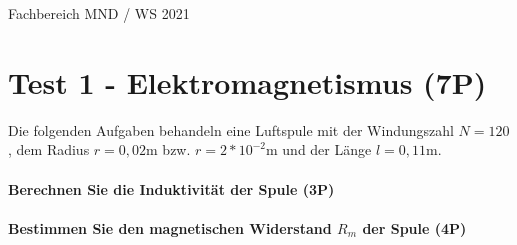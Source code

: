 \documentclass{article}
\begin{document}
Fachbereich MND / WS 2021


\part*{Test 1 - Elektromagnetismus (7P)}

Die folgenden Aufgaben behandeln eine Luftspule mit der Windungszahl $N=120$, dem Radius $r=0{,}02$m bzw. $r=2*10^{ -2 }$m und der Länge $l=0{,}11$m.

\subsection*{Berechnen Sie die Induktivität der Spule (3P)}


\vspace{\baselineskip}\vspace{\baselineskip}\vspace{\baselineskip}

\subsection*{Bestimmen Sie den magnetischen Widerstand $R_{m}$ der Spule (4P)}


\vspace{\baselineskip}
\end{document}
